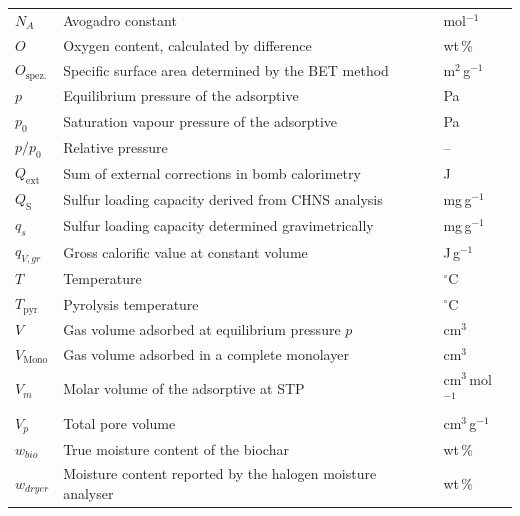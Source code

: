 {\begin{longtable}{L{3cm}L{9.2cm}L{2.5cm}}
\(N_A\)                      & Avogadro constant                                               & mol$^{-1}$\\
\(O\)                        & Oxygen content, calculated by difference                         & wt\,\%\\
\(O_{\mathrm{spez.}}\)       & Specific surface area determined by the BET method              & m$^2$\,g$^{-1}$\\
\(p\)                        & Equilibrium pressure of the adsorptive                           & Pa\\
\(p_0\)                      & Saturation vapour pressure of the adsorptive                     & Pa\\
\(p/p_0\)                    & Relative pressure                                               & --\\
\(Q_{\mathrm{ext}}\)         & Sum of external corrections in bomb calorimetry                 & J\\
\(Q_{\mathrm{S}}\)           & Sulfur loading capacity derived from CHNS analysis              & mg\,g$^{-1}$\\
\(q_s\)                      & Sulfur loading capacity determined gravimetrically              & mg\,g$^{-1}$\\
\(q_{V,gr}\)                 & Gross calorific value at constant volume                        & J\,g$^{-1}$\\
\(T\)                        & Temperature                                                     & $^\circ$C\\
\(T_{\mathrm{pyr}}\)         & Pyrolysis temperature                                           & $^\circ$C\\
\(V\)                        & Gas volume adsorbed at equilibrium pressure $p$                 & cm$^3$\\
\(V_{\mathrm{Mono}}\)        & Gas volume adsorbed in a complete monolayer                     & cm$^3$\\
\(V_m\)                      & Molar volume of the adsorptive at STP                           & cm$^3$\,mol$^{-1}$\\
\(V_p\)                      & Total pore volume                                               & cm$^3$\,g$^{-1}$\\
\(w_{bio}\)                  & True moisture content of the biochar                            & wt\,\%\\
\(w_{dryer}\)                & Moisture content reported by the halogen moisture analyser      & wt\,\%\\

\end{longtable}}
